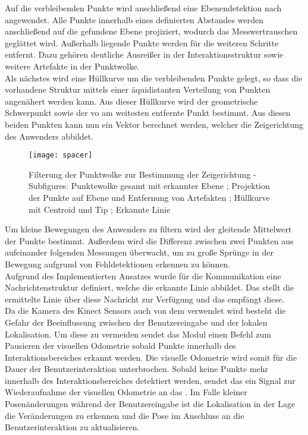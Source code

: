 Auf die verbleibenden Punkte wird anschließend eine Ebenendetektion nach \cite{Fischler1981} angewendet. Alle Punkte innerhalb eines definierten Abstandes werden anschließend auf die gefundene Ebene projiziert, wodurch das Messwertrauschen geglättet wird. Außerhalb liegende Punkte werden für die weiteren Schritte entfernt. Dazu gehören deutliche Ausreißer in der Interaktionsstruktur sowie weitere Artefakte in der Punktwolke.\\
Als nächstes wird eine Hüllkurve um die verbleibenden Punkte gelegt, so dass die vorhandene Struktur mittels einer äquidistanten Verteilung von Punkten angenähert werden kann. Aus dieser Hüllkurve wird der geometrische Schwerpunkt sowie der vo \kps am weitesten entfernte Punkt bestimmt. Aus diesen beiden Punkten kann nun ein Vektor berechnet werden, welcher die Zeigerichtung des Anwenders abbildet.\\

\begin{figure}[!ht]
	\begin{center}
		\texttt{[image: spacer]}
		\caption{Filterung der Punktwolke zur Bestimmung der Zeigerichtung - Subfigures: Punktewolke gesamt mit erkannter Ebene ; Projektion der Punkte auf Ebene und Entfernung von Artefakten ; Hüllkurve mit Centroid und Tip ; Erkannte Linie}
		\label{fig.intdir}
	\end{center}
\end{figure}

Um kleine Bewegungen des Anwenders \red[Tremor?] zu filtern wird der gleitende Mittelwert der Punkte bestimmt. Außerdem wird die Differenz zwischen zwei Punkten aus aufeinander folgenden Messungen überwacht, um zu große Sprünge in der Bewegung aufgrund von Fehldetektionen erkennen zu können.\\
Aufgrund des Implementierten Ansatzes wurde für die Kommunikation eine Nachrichtenstruktur definiert, welche die erkannte Linie abbildet. Das \mInteraction stellt die ermittelte Linie über diese Nachricht zur Verfügung und das \red[\mVisualization ?] empfängt diese.\\

Da die Kamera des Kinect Sensors auch von dem \mFovis verwendet wird besteht die Gefahr der Beeinflussung zwischen der Benutzereingabe und der lokalen Lokalisation. Um diese zu vermeiden sendet das \mInteraction Modul einen Befehl zum Pausieren der visuellen Odometrie sobald Punkte innerhalb des Interaktionsbereiches erkannt werden. Die visuelle Odometrie wird somit für die Dauer der Benutzerinteraktion unterbrochen. Sobald keine Punkte mehr innerhalb des Interaktionsbereiches detektiert werden, sendet das \mInteraction ein Signal zur Wiederaufnahme der visuellen Odometrie an das \mFovis .
Im Falle kleiner Posenänderungen während der Benutzereingabe ist die Lokalisation in der Lage die Veränderungen zu erkennen und die Pose im Anschluss an die Benutzerinteraktion zu aktualisieren.

